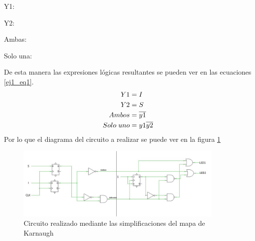 %
Y1:
\begin{center}
\begin{Karnaugh}
\end{Karnaugh}
\end{center}
%
Y2:
\begin{center}
\begin{Karnaugh}
\end{Karnaugh}
\end{center}
%
Ambas:
%
\begin{center}
\begin{Karnaughquatre}
\end{Karnaughquatre}
\end{center}
%
Solo una:
%
\begin{center}
\begin{Karnaughquatre}
\end{Karnaughquatre}
\end{center}
%
\noindent
De esta manera las expresiones lógicas resultantes se pueden ver en las ecuaciones \ref{ej1_eq1}.
%
\begin{equation}
\begin{split}
    Y1&=I\\
    Y2&=S\\
    Ambos&=\overline{y1}\\
    Solo\hspace{1mm}uno&=y1\overline{y2}
\label{ej1_eq1}
\end{split}
\end{equation}
\noindent
Por lo que el diagrama del circuito a realizar se puede ver en la figura \ref{ej1_circuito1.}
%
\begin{figure}[H]
    \centering
    \includegraphics[width=0.9\textwidth]{figs/Ej1/circuitofacilfacil.JPG} %
    \caption{Circuito realizado mediante las simplificaciones del mapa de Karnaugh}
    \label{ej1_circuito1.}
\end{figure}
